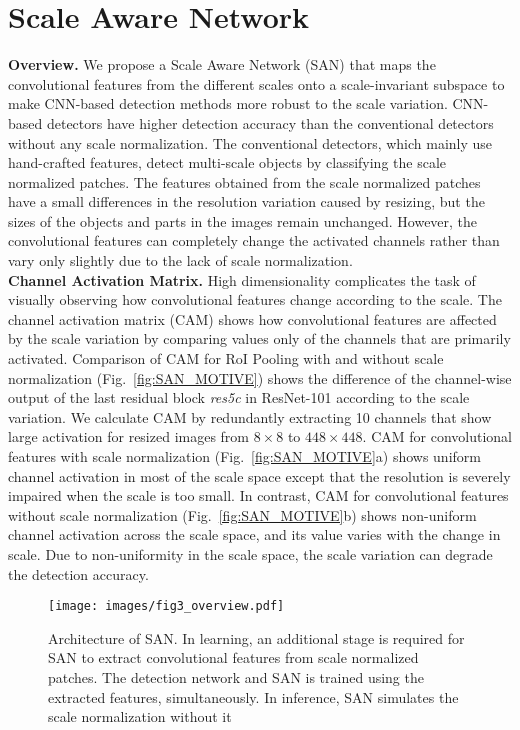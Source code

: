 \documentclass[runningheads]{llncs}
\begin{document}
\section{Scale Aware Network}

\textbf{Overview.}
We propose a Scale Aware Network (SAN) that maps the convolutional features from the different scales onto a scale-invariant subspace to make CNN-based detection methods more robust to the scale variation.
CNN-based detectors have higher detection accuracy than the conventional detectors without any scale normalization.
The conventional detectors, which mainly use hand-crafted features, detect multi-scale objects by classifying the scale normalized patches.
The features obtained from the scale normalized patches have a small differences in the resolution variation caused by resizing, but the sizes of the objects and parts in the images remain unchanged.
However, the convolutional features can completely change the activated channels rather than vary only slightly due to the lack of scale normalization.
\\

\noindent
\textbf{Channel Activation Matrix.} 
High dimensionality complicates the task of visually observing how convolutional features change according to the scale.
The channel activation matrix (CAM) shows how convolutional features are affected by the scale variation by comparing values only of the channels that are primarily activated.
Comparison of CAM for RoI Pooling with and without scale normalization (Fig.~\ref{fig:SAN_MOTIVE}) shows the difference of the channel-wise output of the last residual block \textit{res5c} in ResNet-101 according to the scale variation.
We calculate CAM by redundantly extracting 10 channels that show large activation for resized images from $8\times8$ to $448\times448$.
CAM for convolutional features with scale normalization (Fig.~\ref{fig:SAN_MOTIVE}a) shows uniform channel activation in most of the scale space except that the resolution is severely impaired when the scale is too small.
In contrast, CAM for convolutional features without scale normalization (Fig.~\ref{fig:SAN_MOTIVE}b) shows non-uniform channel activation across the scale space, and its value varies with the change in scale.
Due to non-uniformity in the scale space, the scale variation can degrade the detection accuracy.
\\


\begin{figure}[t]
	\texttt{[image: images/fig3\_overview.pdf]}
	\caption{Architecture of SAN.
		In learning, an additional stage is required for SAN to extract convolutional features from scale normalized patches.
		The detection network and SAN is trained using the extracted features, simultaneously.
		In inference, SAN simulates the scale normalization without it
	}
	\centering
	\label{fig:SAN_ARCH}
\end{figure}
\end{document}
